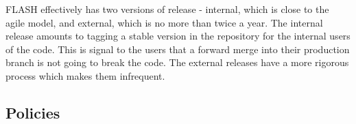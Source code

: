 FLASH effectively has two versions of release - internal, which
is close to the agile model, and external, which is no more than twice
a year. The internal release amounts to tagging a stable version in
the repository for the internal users of the code. This is signal to
the users that a forward merge into their production branch is not
going to break the code. The external releases have a more rigorous
process which makes them infrequent. 
\subsection{Policies}